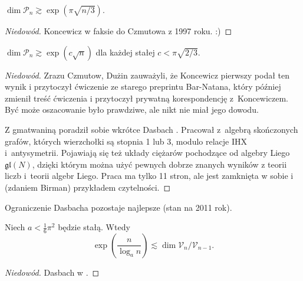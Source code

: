 \begin{proposition}
    $\dim \mathcal P_n \gtrsim \exp (\pi \sqrt{n/3})$.
\end{proposition}

\begin{proof}[Niedowód]
%
%
    Koncewicz w faksie do Czmutowa z 1997 roku. :)
\end{proof}

\begin{proposition}
    $\dim \mathcal P_n \gtrsim \exp (c \sqrt{n})$ dla każdej stałej $c < \pi \sqrt{2/3}$.
\end{proposition}

\begin{proof}[Niedowód]
    Zrazu Czmutow, Dużin \cite[s. 202]{duzhin1999} zauważyli, że Koncewicz pierwszy podał  ten wynik i przytoczył ćwiczenie ze starego preprintu Bar-Natana, który później zmienił treść ćwiczenia i przytoczył prywatną korespondencję z~Koncewiczem.
    Być może oszacowanie było prawdziwe, ale nikt nie miał jego dowodu.
    
    Z gmatwaniną poradził sobie wkrótce Dasbach  \cite{dasbach2000}.
    Pracował z~algebrą skończonych grafów, których wierzchołki są stopnia 1 lub 3, modulo relacje IHX i~antysymetrii.
    Pojawiają się też układy ciężarów pochodzące od algebry Liego $\mathfrak{gl}(N)$, dzięki którym można użyć pewnych dobrze znanych wyników z teorii liczb i~teorii algebr Liego.
    Praca \cite{dasbach2000} ma tylko 11 stron, ale jest zamknięta w sobie i (zdaniem Birman) przykładem czytelności.
\end{proof}

Ograniczenie Dasbacha pozostaje najlepsze (stan na 2011 rok).

\begin{corollary}
    Niech $a < \frac 1 6 \pi^2$ będzie stałą.
    Wtedy
    \begin{equation}
        \exp \left(\frac {n}{\log_a n} \right) \lesssim \dim \mathcal V_n / \mathcal V_{n-1}.
    \end{equation}
\end{corollary}

\begin{proof}[Niedowód]
%
    Dasbach w \cite{dasbach2000}.
\end{proof}

